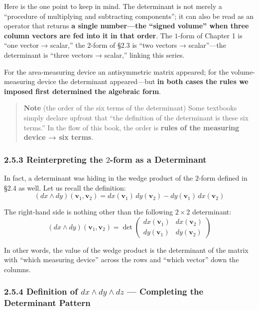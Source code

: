 Here is the one point to keep in mind. The determinant is not merely a
``procedure of multiplying and subtracting components''; it can also be
read as an operator that returns
\textbf{a single number—the “signed volume” when three column vectors are fed into it in that order}.
The \(1\)-form of Chapter 1 is ``one vector → scalar,'' the \(2\)-form
of §2.3 is ``two vectors → scalar''---the determinant is ``three vectors
→ scalar,'' linking this series.

For the area-measuring device an antisymmetric matrix appeared; for the
volume-measuring device the determinant appeared---but
\textbf{in both cases the rules we imposed first determined the algebraic form}.

\begin{quote}
\textbf{Note} (the order of the six terms of the determinant) Some
textbooks simply declare upfront that ``the definition of the
determinant is these six terms.'' In the flow of this book, the order is
\textbf{rules of the measuring device → six terms}.
\end{quote}

\hypertarget{reinterpreting-the-2-form-as-a-determinant}{%
\subsubsection{\texorpdfstring{2.5.3 Reinterpreting the \(2\)-form as a
Determinant}{2.5.3 Reinterpreting the 2-form as a Determinant}}\label{reinterpreting-the-2-form-as-a-determinant}}

In fact, a determinant was hiding in the wedge product of the \(2\)-form
defined in §2.4 as well. Let us recall the definition:
\[(dx \wedge dy)(\mathbf{v}_1, \mathbf{v}_2) = dx(\mathbf{v}_1)\,dy(\mathbf{v}_2) - dy(\mathbf{v}_1)\,dx(\mathbf{v}_2)\]

The right-hand side is nothing other than the following \(2 \times 2\)
determinant:
\[(dx \wedge dy)(\mathbf{v}_1, \mathbf{v}_2) = \det\begin{pmatrix} dx(\mathbf{v}_1) & dx(\mathbf{v}_2) \\ dy(\mathbf{v}_1) & dy(\mathbf{v}_2) \end{pmatrix}\]

In other words, the value of the wedge product is the determinant of the
matrix with ``which measuring device'' across the rows and ``which
vector'' down the columns.

\hypertarget{definition-of-dx-wedge-dy-wedge-dz-completing-the-determinant-pattern}{%
\subsubsection{\texorpdfstring{2.5.4 Definition of
\(dx \wedge dy \wedge dz\) --- Completing the Determinant
Pattern}{2.5.4 Definition of dx \textbackslash wedge dy \textbackslash wedge dz --- Completing the Determinant Pattern}}\label{definition-of-dx-wedge-dy-wedge-dz-completing-the-determinant-pattern}}

